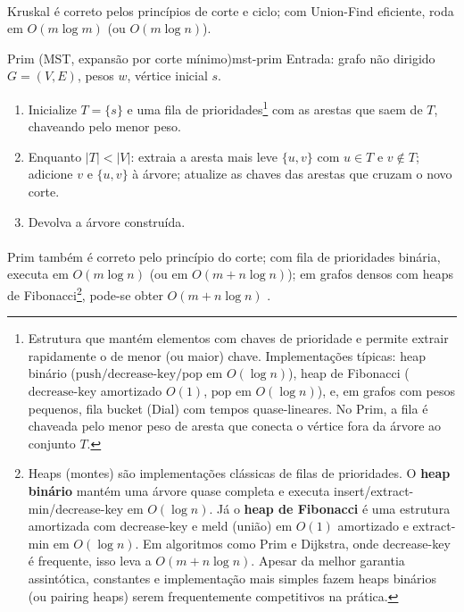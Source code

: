 \documentclass[12pt,a4paper]{article}
\def\texttt#1{#1}%
\def\emph#1{#1}%
\begin{document}
\paragraph{}Kruskal é correto pelos princípios de corte e ciclo; com Union-Find eficiente, roda em \(O(m\log m)\) (ou \(O(m\log n)\)).

\begin{algobox}{Prim (MST, expansão por corte mínimo)}{mst-prim}
Entrada: grafo não dirigido \(G=(V,E)\), pesos \(w\), vértice inicial \(s\).
\begin{enumerate}\setlength{\itemsep}{2pt}
    \item Inicialize \(T=\{s\}\) e uma fila de prioridades\footnote{Estrutura que mantém elementos com chaves de prioridade e permite extrair rapidamente o de menor (ou maior) chave. Implementações típicas: \emph{heap} binário (\(\mathrm{push}/\mathrm{decrease\text{-}key}/\mathrm{pop}\) em \(O(\log n)\)), \emph{heap} de Fibonacci (\(\mathrm{decrease\text{-}key}\) amortizado \(O(1)\), \(\mathrm{pop}\) em \(O(\log n)\)), e, em grafos com pesos pequenos, fila bucket (Dial) com tempos quase-lineares. No Prim, a fila é chaveada pelo menor peso de aresta que conecta o vértice fora da árvore ao conjunto \(T\).} com as arestas que saem de \(T\), chaveando pelo menor peso.
    \item Enquanto \(|T|<|V|\): extraia a aresta mais leve \(\{u,v\}\) com \(u\in T\) e \(v\notin T\); adicione \(v\) e \(\{u,v\}\) à árvore; atualize as chaves das arestas que cruzam o novo corte.
    \item Devolva a árvore construída.
\end{enumerate}
\end{algobox}

\paragraph{}Prim também é correto pelo princípio do corte; com fila de prioridades binária, executa em \(O(m\log n)\) (ou em \(O(m+n\log n)\)); em grafos densos com \emph{heaps} de Fibonacci\footnote{\emph{Heaps} (montes) são implementações clássicas de filas de prioridades. O \textbf{heap binário} mantém uma árvore quase completa e executa \texttt{insert}/\texttt{extract-min}/\texttt{decrease-key} em \(O(\log n)\). Já o \textbf{heap de Fibonacci} é uma estrutura amortizada com \texttt{decrease-key} e \texttt{meld} (união) em \(O(1)\) amortizado e \texttt{extract-min} em \(O(\log n)\). Em algoritmos como Prim e Dijkstra, onde \texttt{decrease-key} é frequente, isso leva a \(O(m+n\log n)\). Apesar da melhor garantia assintótica, constantes e implementação mais simples fazem heaps binários (ou \emph{pairing heaps}) serem frequentemente competitivos na prática.}, pode-se obter \(O(m+n\log n)\) \cite{cormen2009,kleinberg2006,west2001introduction,diestel2017graph}.
\end{document}
